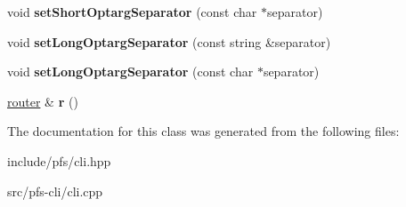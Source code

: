 \begin{DoxyCompactItemize}
\item 
\hypertarget{classpfs_1_1cli_1_1cli_a46c1a439807a65c5b59261ce6b4f8d1d}{void {\bfseries set\-Short\-Optarg\-Separator} (const char $\ast$separator)}\label{classpfs_1_1cli_1_1cli_a46c1a439807a65c5b59261ce6b4f8d1d}

\item 
\hypertarget{classpfs_1_1cli_1_1cli_ab49eb1a09f6fef22208986d59e2e6a0e}{void {\bfseries set\-Long\-Optarg\-Separator} (const string \&separator)}\label{classpfs_1_1cli_1_1cli_ab49eb1a09f6fef22208986d59e2e6a0e}

\item 
\hypertarget{classpfs_1_1cli_1_1cli_aff716b44118f56161a2987b90cb55e90}{void {\bfseries set\-Long\-Optarg\-Separator} (const char $\ast$separator)}\label{classpfs_1_1cli_1_1cli_aff716b44118f56161a2987b90cb55e90}

\item 
\hypertarget{classpfs_1_1cli_1_1cli_a41a4882ab0f4a076bf5a74acbde5fcdd}{\hyperlink{classpfs_1_1cli_1_1router}{router} \& {\bfseries r} ()}\label{classpfs_1_1cli_1_1cli_a41a4882ab0f4a076bf5a74acbde5fcdd}

\end{DoxyCompactItemize}


The documentation for this class was generated from the following files\-:\begin{DoxyCompactItemize}
\item 
include/pfs/cli.\-hpp\item 
src/pfs-\/cli/cli.\-cpp\end{DoxyCompactItemize}
